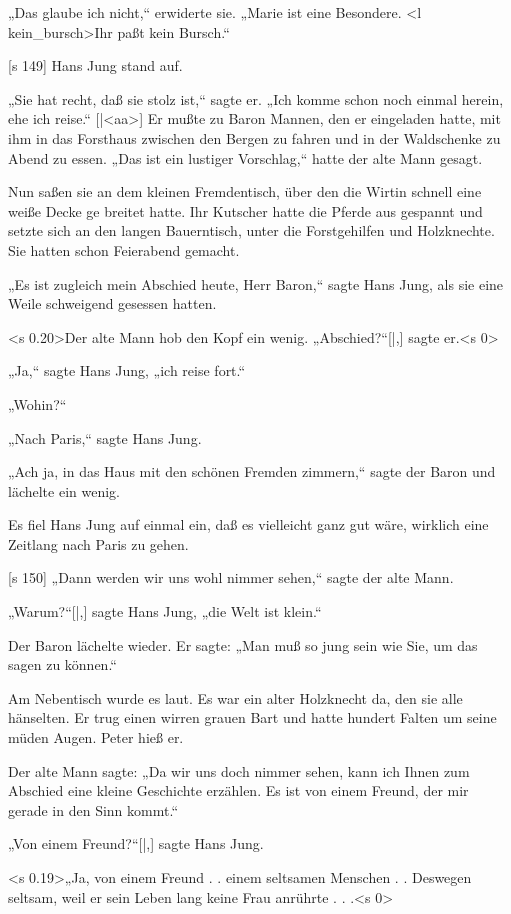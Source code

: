 „Das glaube ich nicht,“ erwiderte sie. „Marie
ist eine Besondere. <l kein_bursch>Ihr paßt kein Bursch.“

[s 149]
Hans Jung stand auf.

„Sie hat recht, daß sie stolz ist,“ sagte er. „Ich
komme schon noch einmal herein, ehe ich reise.“
[|<aa>]
Er mußte zu Baron Mannen, den er eingeladen
hatte, mit ihm in das Forsthaus zwischen den Bergen
zu fahren und in der Waldschenke zu Abend zu
essen. „Das ist ein lustiger Vorschlag,“ hatte der
alte Mann gesagt.

Nun saßen sie an dem kleinen Fremdentisch,
über den die Wirtin schnell eine weiße Decke ge­
breitet hatte. Ihr Kutscher hatte die Pferde aus­
gespannt und setzte sich an den langen Bauerntisch,
unter die Forstgehilfen und Holzknechte. Sie hatten
schon Feierabend gemacht.

„Es ist zugleich mein Abschied heute, Herr
Baron,“ sagte Hans Jung, als sie eine Weile schweigend
gesessen hatten.

<s 0.20>Der alte Mann hob den Kopf ein wenig.
„Abschied?“[|,] sagte er.<s 0>

„Ja,“ sagte Hans Jung, „ich reise fort.“

„Wohin?“

„Nach Paris,“ sagte Hans Jung.

„Ach ja, in das Haus mit den schönen Fremden­
zimmern,“ sagte der Baron und lächelte ein wenig.

Es fiel Hans Jung auf einmal ein, daß es vielleicht
ganz gut wäre, wirklich eine Zeitlang nach Paris zu gehen.

[s 150]
„Dann werden wir uns wohl nimmer sehen,“
sagte der alte Mann.

„Warum?“[|,] sagte Hans Jung, „die Welt ist klein.“

Der Baron lächelte wieder. Er sagte: „Man
muß so jung sein wie Sie, um das sagen zu können.“

Am Nebentisch wurde es laut. Es war ein
alter Holzknecht da, den sie alle hänselten. Er trug
einen wirren grauen Bart und hatte hundert Falten
um seine müden Augen. Peter hieß er.

Der alte Mann sagte: „Da wir uns doch nimmer
sehen, kann ich Ihnen zum Abschied eine kleine
Geschichte erzählen. Es ist von einem Freund, der
mir gerade in den Sinn kommt.“

„Von einem Freund?“[|,] sagte Hans Jung.

<s 0.19>„Ja, von einem Freund . . einem seltsamen
Menschen . . Deswegen seltsam, weil er sein Leben
lang keine Frau anrührte . . .<s 0>

